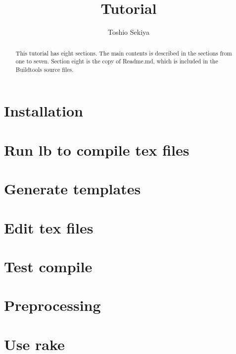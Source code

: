 \documentclass{article}
\title{Tutorial}
\author{Toshio Sekiya} %
\begin{document}
\maketitle
\tableofcontents

\begin{abstract}
This tutorial has eight sections.
The main contents is described in the sections from one to seven.
Section eight is the copy of Readme.md, which is included in the Buildtools source files.
\end{abstract}

\section{Installation}
  
\section{Run lb to compile tex files}
  
\section{Generate templates}
  
\section{Edit tex files}
  
\section{Test compile}\label{sec:testcompile}
  
\section{Preprocessing}
  
\section{Use rake}
  

\end{document}
